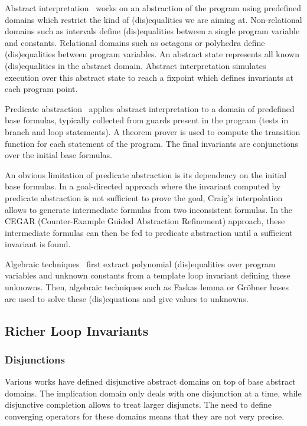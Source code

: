 \documentclass[a4paper,10pt]{article}
\begin{document}
Abstract interpretation~\cite{cousot:1978:popl, mine:2006:hosc} works on an
abstraction of the program using predefined domains which restrict the kind of
(dis)equalities we are aiming at. Non-relational domains such as intervals
define (dis)equalities between a single program variable and
constants. Relational domains such as octagons or polyhedra define
(dis)equalities between program variables. An abstract state represents all
known (dis)equalities in the abstract domain. Abstract interpretation simulates
execution over this abstract state to reach a fixpoint which defines invariants
at each program point.

Predicate abstraction~\cite{graf:1997:cav} applies abstract interpretation to a
domain of predefined base formulas, typically collected from guards present in
the program (tests in branch and loop statements). A theorem prover is used to
compute the transition function for each statement of the program. The final
invariants are conjunctions over the initial base formulas.

An obvious limitation of predicate abstraction is its dependency on the initial
base formulas. In a goal-directed approach where the invariant computed by
predicate abstraction is not sufficient to prove the goal, Craig's
interpolation~\cite{mcmillan:2003:cav, mcmillan:2006:cav} allows to generate
intermediate formulas from two inconsistent formulas. In the CEGAR
(Counter-Example Guided Abstraction Refinement) approach, these intermediate
formulas can then be fed to predicate abstraction until a sufficient invariant
is found.

Algebraic techniques~\cite{colon:2003:cav, sankaranarayanan:2004:popl,
  kovacs:2008:csr} first extract polynomial (dis)equalities over program
variables and unknown constants from a template loop invariant defining these
unknowns. Then, algebraic techniques such as Faskas lemma or Gröbner bases are
used to solve these (dis)equations and give values to unknowns.

\subsection{Richer Loop Invariants}

\subsubsection*{Disjunctions}

Various works have defined disjunctive abstract domains on top of base abstract
domains. The implication domain only deals with one disjunction at a time,
while disjunctive completion allows to treat larger disjuncts. The need to
define converging operators for these domains means that they are not very
precise.
\end{document}
